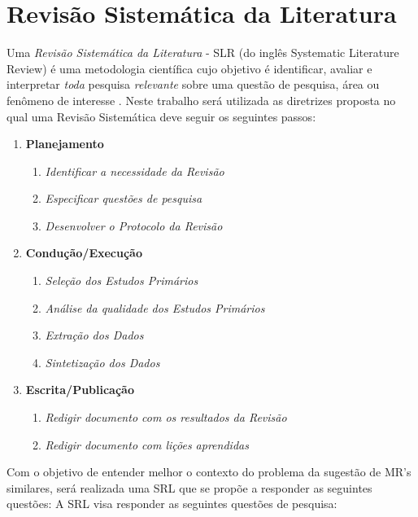 \documentclass[msc,proposal,hidelot,hideabstract]{ppgccufmg} %
\begin{document}
\section{Revisão Sistemática da Literatura}
\label{sec:revisao_sistematica}

Uma \textit{Revisão Sistemática da Literatura} - SLR (do inglês Systematic Literature Review) é uma
metodologia científica cujo objetivo é identificar, avaliar e interpretar
\textit{toda} pesquisa \textit{relevante} sobre uma questão de pesquisa, área
ou fenômeno de interesse \cite{keele2007guidelines,wohlin2012experimentation}. Neste trabalho
será utilizada as diretrizes proposta \cite{keele2007guidelines} no qual uma
Revisão Sistemática deve seguir os seguintes passos:

\begin{enumerate}
  \item \textbf{Planejamento}
  \begin{enumerate}
    \item \textit{Identificar a necessidade da Revisão}
    \item \textit{Especificar questões de pesquisa}
    \item \textit{Desenvolver o Protocolo da Revisão}
  \end{enumerate}
  \item \textbf{Condução/Execução}
  \begin{enumerate}
    \item \textit{Seleção dos Estudos Primários}
    \item \textit{Análise da qualidade dos Estudos Primários}
     \item \textit{Extração dos Dados}
     \item \textit{Sintetização dos Dados}
   \end{enumerate}
  \item \textbf{Escrita/Publicação}
  \begin{enumerate}
    \item \textit{Redigir documento com os resultados da Revisão}
    \item \textit{Redigir documento com lições aprendidas}
  \end{enumerate}
\end{enumerate}

Com o objetivo de entender melhor o contexto do problema da sugestão de MR's
similares, será realizada uma SRL que se propõe a responder as seguintes
questões:  A SRL visa responder as seguintes questões de
pesquisa:
\end{document}
